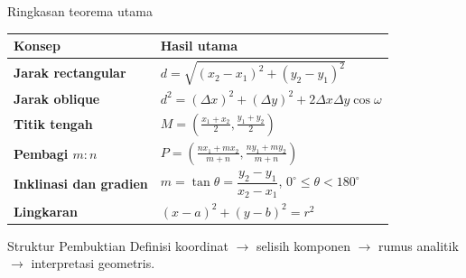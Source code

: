 \documentclass[aspectratio=169,11pt]{beamer}
\begin{document}
\begin{frame}{Ringkasan teorema utama}
	\renewcommand{\arraystretch}{1.45}
	\begin{tabular}{>{\bfseries}p{}p{}}
		\toprule
		Konsep & Hasil utama\\
		\midrule
		Jarak rectangular &
		$d=\sqrt{(x_2-x_1)^2+(y_2-y_1)^2}$\\
		Jarak oblique &
		$d^2=(\Delta x)^2+(\Delta y)^2+2\Delta x\Delta y\cos\omega$\\
		Titik tengah &
		$M=\left(\frac{x_1+x_2}{2},\frac{y_1+y_2}{2}\right)$\\
		Pembagi $m:n$ &
		$P=\left(\frac{nx_1+mx_2}{m+n},\frac{ny_1+my_2}{m+n}\right)$\\
		Inklinasi dan gradien &
		$m=\tan\theta=\dfrac{y_2-y_1}{x_2-x_1}$, $0^\circ\leq\theta<180^\circ$\\
		Lingkaran &
		$(x-a)^2+(y-b)^2=r^2$\\
		\bottomrule
	\end{tabular}
	
	\vspace{0.25cm}
	\begin{alertblock}{Struktur Pembuktian}
		Definisi koordinat $\rightarrow$ selisih komponen $\rightarrow$
		rumus analitik $\rightarrow$ interpretasi geometris.
	\end{alertblock}
\end{frame}
%
%
\end{document}

